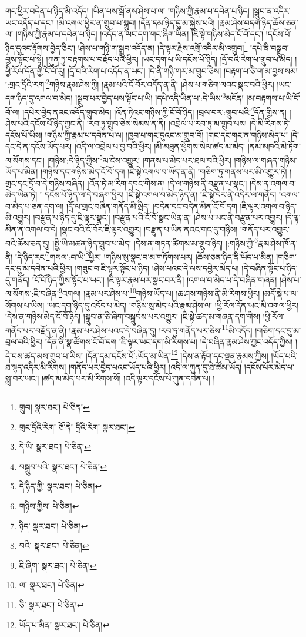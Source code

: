 གང་ཕྱིར་བདེན་པ་ཉིད་མི་འདོད། །ཡིན་པས་སྒོ་ནས་ཤེས་པ་ལ། །གཉིས་ཀྱི་རྣམ་པ་དབེན་པ་ཉིད། །སྒྲུབ་ན་འདིར་ཡང་འདོད་པ་དང་། །མི་འགལ་ཕྱིར་ན་གྲུབ་པ་སྒྲུབ། །དོན་དམ་ཉིད་དུ་མ་སྐྱེས་པའི། །རྣམ་ཤེས་བདག་ཉིད་ཆོས་ཅན་ལ། །གཉིས་ཀྱི་རྣམ་པ་དབེན་པ་ཉིད། །འདོད་ན་ཡང་དག་གང་ཞིག་ཡིན། །ཇི་སྟེ་གཉིས་མེད་ངོ་བོ་དང་། །དངོས་པོ་ཉིད་དུའང་རྟོགས་བྱེད་ཅིང་། །ཤེས་པ་གཉི་ག་སྒྲུབ་འདོད་ན། །དེ་ལྟར་རྗེས་འགྲོ་འདིར་མི་འགྲུབ།\footnote{གྲུབ།  སྣར་ཐང་།  པེ་ཅིན། } །དཔེ་ནི་བསྒྲུབ་བྱས་སྟོང་པ་སྟེ། །ཀུན་ཏུ་བརྟགས་པ་བརྗོད་པའི་ཕྱིར། །ཡང་དག་པ་ཡི་དངོས་པོ་ཉིད། །དྲོ་བའི་རེག་པ་གྲུབ་པ་མེད། །ཕྱི་རོལ་དོན་གྱི་ངོ་བོ་རུ། །དྲོ་བའི་རེག་པ་འདོད་ན་ཡང་། །དེ་ནི་གཉི་གར་མ་གྲུབ་ཅེས། །བརྟག་པ་ཅི་ག་མ་བྱས་སམ། །:གྲང་དྲོའི་རག་\footnote{གྲང་དྲོའི་རེག་  ཅོ་ནེ། དྲིའི་རེག་  སྣར་ཐང་། }གཉིས་རྣམ་ཤེས་ཀྱི། །རྣམ་པའི་ངོ་བོར་འདོད་ན་ནི། །ཤེས་པ་གཅིག་ལའང་སྣང་བའི་ཕྱིར། །ཡང་དག་ཉིད་དུ་འགལ་བ་མེད། །སྒྲུབ་པར་བྱེད་པས་སྟོང་པ་ཡི། །དཔེ་འདི་ཡིན་པ་:དེ་ཡིས་\footnote{དེ་ཡི་  སྣར་ཐང་།  པེ་ཅིན། }མངོན། །མ་བརྟགས་པ་ཡི་ངོ་བོ་ལ། །དཔེར་བྱེད་ནའང་འདོད་གྲུབ་མེད། །འོན་ཏེའང་གཉིས་ཀྱི་ངོ་བོ་ཉིད། །བྲལ་བར་:གྲུབ་པའི་\footnote{བསྒྲུབ་པའི་  སྣར་ཐང་།  པེ་ཅིན། }དོན་གྱིས་ན། །ཤེས་པའི་དངོས་པོ་ཉིད་ཀྱང་ནི། །རབ་ཏུ་གྲུབ་ཅེས་སེམས་ན་ནི། །འབྲེལ་པ་རབ་ཏུ་མ་གྲུབ་པས། །དེ་མི་རིགས་ཏེ་དངོས་པོ་ཡིས། །གཉིས་ཀྱི་རྣམ་པ་དབེན་པ་ལ། །ཁྱབ་པ་གང་དུའང་མ་གྲུབ་བོ། །གང་དང་གང་ན་གཉིས་མེད་པ། །དེ་དང་དེ་ན་དངོས་ཡོད་པར། །འདི་ལ་འབྲེལ་པ་བྱ་བའི་ཕྱིར། །མི་མཐུན་ཕྱོགས་སེལ་ཚད་མ་མེད། །ནམ་མཁའི་མེ་ཏོག་ལ་སོགས་དང་། །གཉིས་:དེ་ཉིད་ཀྱིས་\footnote{དེ་ཉིད་ཀྱི་  སྣར་ཐང་།  པེ་ཅིན། }མ་ངེས་འགྱུར། །གནས་པ་མེད་པར་ཐལ་བའི་ཕྱིར། །གཉིས་ལ་གཞན་གཉིས་ཡོད་པ་མིན། །གཉིས་དང་གཉིས་མེད་ངོ་བོ་དག །ཇི་སྟེ་འགལ་བ་ཡོད་ན་ནི། །གཅིག་ཏུ་གནས་པར་མི་འགྱུར་ཏེ། །གྲང་དང་དྲོ་བ་དེ་གཉིས་བཞིན། །འོན་ཏེ་མ་རིག་དབང་གིས་ན། །དེ་ལ་གཉིས་ནི་བརྫུན་པ་སྣང་། །དེས་ན་འགལ་བ་མེད་ཡིན་ཏེ། །
དངོས་པོ་ཉིད་ལ་དེ་བཞག་ཕྱིར། །ཇི་སྟེ་འགལ་བ་མེད་ཉིད་ན། །ཇི་སྟེ་དེར་ནི་འདིར་ལ་གནོད། །འགལ་བ་མེད་པ་ཅན་དག་ལ། །དྲོ་ལ་གྲང་བཞིན་གནོད་མི་སྲིད། །བདེན་དང་བདེན་མིན་ངོ་བོ་དག །ཇི་ལྟར་འགལ་བ་ཉིད་མི་འགྱུར། །བརྫུན་པ་ཉིད་དུ་ཇི་ལྟར་སྣང་། །བརྫུན་པའི་ངོ་བོ་སྣང་ཡིན་ན། །ཤེས་པ་ཡང་ནི་བརྫུན་པར་འགྱུར། །དེ་ལྟ་མིན་ན་འགལ་བ་དེ། །སྣང་བའི་ངོ་བོར་ཇི་ལྟར་འགྱུར། །བརྫུན་པ་ཡིན་ནའང་གང་དུ་གཉིས། །གནོད་པར་འགྱུར་བའི་ཆོས་ཅན་དུ། །སྤྱི་ཡི་མཚན་ཉིད་གྲུབ་པ་མེད། །དེས་ན་གཏན་ཚིགས་མ་གྲུབ་ཉིད། །:གཉིས་ཀྱི་\footnote{གཉིས་ཀྱིས་  པེ་ཅིན། }རྣམ་ཤེས་ཁོ་ན་ནི། །དེ་ཉིད་རང་\footnote{ཉིད་  སྣར་ཐང་།  པེ་ཅིན། }གསལ་:བ་ཡི་\footnote{བའི་  སྣར་ཐང་།  པེ་ཅིན། }ཕྱིར། །གཉིས་སུ་སྣང་བ་མ་གཏོགས་པར། །ཆོས་ཅན་ཉིད་ནི་ཡོད་པ་མིན། །གཅིག་དང་དུ་མ་དབེན་པའི་ཕྱིར། །གཟུང་བ་ཇི་ལྟར་སྟོང་པ་ཉིད། །ཤེས་པའང་དེ་ལས་དབྱེར་མེད་པ། །དེ་བཞིན་སྟོང་པ་ཉིད་དུ་གནོད། །ངོ་བོ་ཉིད་ཀྱིས་སྟོང་པ་ཡང་། །ཇི་ལྟར་རྣམ་པར་སྣང་བར་ནི། །འགལ་བ་མེད་པ་དེ་བཞིན་གཞན། །ཤེས་པ་ལ་སོགས་:ཇི་བཞིན་\footnote{ཇི་ཞིག་  སྣར་ཐང་།  པེ་ཅིན། }འགལ། །རྣམ་པར་ཤེས་པ་\footnote{ལ་  སྣར་ཐང་།  པེ་ཅིན། }གཉིས་ཡོད་པ། །ཆ་ཤས་གཉིས་ནི་མི་རིགས་ཕྱིར། །མདོ་སྡེ་པ་ལ་སོགས་པ་ཡིས། །ཡང་དག་ཉིད་དུ་འདོད་པ་མེད། །གཉིས་སུ་མེད་པའི་རྣམ་ཤེས་ལ། །ཕྱི་རོལ་དོན་ཡང་མི་འགལ་ཕྱིར། །དེས་ན་གཉིས་མེད་ངོ་བོ་ཉིད། །སྒྲུབ་ན་ཅི་ཞིག་བསྒྲུབས་པར་འགྱུར། །ཇི་སྟེ་ཚད་མ་གཞན་དག་གིས། །ཕྱི་རོལ་གནོད་པར་བརྗོད་ན་ནི། །རྣམ་པར་ཤེས་པའང་དེ་བཞིན་དུ། །རབ་ཏུ་གནོད་པར་ཅིས་\footnote{ཅི་  སྣར་ཐང་།  པེ་ཅིན། }མི་འདོད། །གཅིག་དང་དུ་མ་བྲལ་བའི་ཕྱིར། །དོན་ནི་སྣ་ཚོགས་ངོ་བོ་དག །ཇི་ལྟར་ཡང་དག་མི་རིགས་པ། །དེ་བཞིན་རྣམ་ཤེས་ཀྱང་འདོད་ཀྱིས། །དེ་བས་ཚད་མས་གྲུབ་པ་ཡིས། །དོན་དམ་དངོས་པོ་:ཡོད་མ་ཡིན།\footnote{ཡོད་པ་མིན།  སྣར་ཐང་།  པེ་ཅིན། } །དེས་ན་རྟོག་དང་ལྡན་རྣམས་ཀྱིས། །ཡོད་པའི་ཐ་སྙད་འདིར་མི་རིགས། །གནོད་པར་བྱེད་པའང་ཡོད་པའི་ཕྱིར། །འདི་ལ་ཀུན་དུ་ཐེ་ཚོམ་ཡོད། །དངོས་པོར་མེད་པ་སྨྲ་བར་ཡང་། །ཚད་མ་མེད་པར་མི་རིགས་སོ། །འདི་ལྟར་དངོས་པོ་ཀུན་དབེན་པ། །
